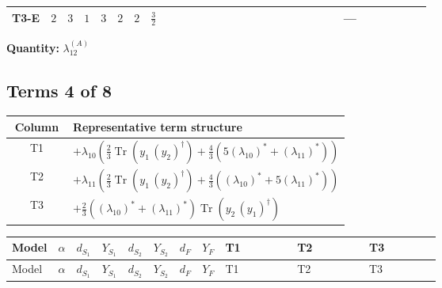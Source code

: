 \documentclass[8pt]{article}
\begin{document}
\begin{landscape}
\begin{longtable}{@{}llcccccc >{\raggedright\arraybackslash}p{0.21\linewidth} >{\raggedright\arraybackslash}p{0.21\linewidth} >{\raggedright\arraybackslash}p{0.21\linewidth}@{}}
\midrule
T3-E & $2$ & $3$ & $1$ & $3$ & $2$ & $2$ & $\frac{3}{2}$ & \scriptsize\adjustbox{max width=\linewidth}{$\begin{gathered} +2 {\lambda_{12}^{(A)}} {\lambda_{S_1}^{(1)}}\end{gathered}$} & \scriptsize\adjustbox{max width=\linewidth}{$\begin{gathered} +2 {\lambda_{12}^{(A)}} {\lambda_{S_2}^{(1)}}\end{gathered}$} & --- \\
\midrule
\bottomrule
\end{longtable}
\clearpage
\noindent\textbf{Quantity: }$\lambda_{12}^{(A)}$\par\smallskip
\subsection*{Terms 4 of 8}
\begin{center}
\begin{tabular}{@{}c >{\raggedright\arraybackslash}p{0.82\linewidth}@{}}
\toprule
Column & Representative term structure \\
\midrule
T1 & \(\displaystyle +{\lambda_{10}} \left(\frac{2}{3} \operatorname{Tr}\!\left({y_1}\,\left({y_2}\right)^{\dagger}\right)+\frac{4}{3} (5 \left({\lambda_{10}}\right)^{*}+\left({\lambda_{11}}\right)^{*})\right)\) \\
\midrule
T2 & \(\displaystyle +{\lambda_{11}} \left(\frac{2}{3} \operatorname{Tr}\!\left({y_1}\,\left({y_2}\right)^{\dagger}\right)+\frac{4}{3} (\left({\lambda_{10}}\right)^{*}+5 \left({\lambda_{11}}\right)^{*})\right)\) \\
\midrule
T3 & \(\displaystyle +\frac{2}{3} (\left({\lambda_{10}}\right)^{*}+\left({\lambda_{11}}\right)^{*}) \operatorname{Tr}\!\left({y_2}\,\left({y_1}\right)^{\dagger}\right)\) \\
\midrule
\bottomrule
\end{tabular}
\end{center}
\smallskip
\tiny
\begin{longtable}{@{}llcccccc >{\raggedright\arraybackslash}p{0.21\linewidth} >{\raggedright\arraybackslash}p{0.21\linewidth} >{\raggedright\arraybackslash}p{0.21\linewidth}@{}}
\toprule
Model & $\alpha$ & $d_{S_1}$ & $Y_{S_1}$ & $d_{S_2}$ & $Y_{S_2}$ & $d_F$ & $Y_F$ & T1 & T2 & T3 \\
\midrule
\endfirsthead
\toprule
Model & $\alpha$ & $d_{S_1}$ & $Y_{S_1}$ & $d_{S_2}$ & $Y_{S_2}$ & $d_F$ & $Y_F$ & T1 & T2 & T3 \\
\midrule

\end{longtable}
\end{landscape}
\end{document}
